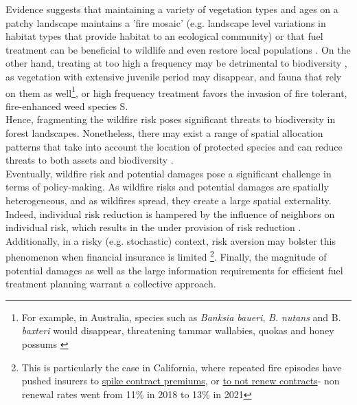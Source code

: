 Evidence suggests that maintaining a variety of vegetation types and ages on a patchy landscape maintains a 'fire mosaic' \citep{Sitters2015} (e.g. landscape level variations in habitat types that provide habitat to an ecological community) or that fuel treatment can be beneficial to wildlife \citep{saab_short-term_2022, loeb_bats_2021} and even restore local populations \citep{Templeton2011}. On the other hand, treating at too high a frequency may be detrimental to biodiversity \citep{bradshaw2018}, as vegetation with extensive juvenile period may disappear, and fauna that rely on them as well\footnote{For example, in Australia, species such as \textit{Banksia baueri}, \textit{B. nutans} and B. \textit{baxteri} would disappear, threatening tammar wallabies, quokas and honey possums \citep{bradshaw2018}}, or high frequency treatment favors the invasion of fire tolerant, fire-enhanced weed species \citep{vanWilgen_fire_2013}S. 
%
\\
Hence, fragmenting the wildfire risk poses significant threats to biodiversity in forest landscapes. Nonetheless, there may exist a range of spatial allocation patterns that take into account the location of protected species and can reduce threats to both assets and biodiversity \citep{ager_modeling_2007, king_relative_2008, rachmawati_fuel_2018}. 
\\
\hspace*{1.5em}Eventually, wildfire risk and potential damages pose a significant challenge in terms of policy-making. As wildfire risks and potential damages are spatially heterogeneous, and as wildfires spread, they create a large spatial externality. Indeed, individual risk reduction is hampered by the influence of neighbors on individual risk, which results in the under provision of risk reduction \citep{costello_private_2017}. Additionally, in a risky (e.g. stochastic) context, risk aversion may bolster this phenomenon when financial insurance is limited \citep{ehrlich_market_1972}\footnote{This is particularly the case in California, where repeated fire episodes have pushed insurers to \href{https://calmatters.org/economy/2024/05/california-insurance-mitigation/}{spike contract premiums}, or \href{https://www.nbclosangeles.com/news/california-wildfires/state-farm-california-los-angeles-homeowners-insurance-policy/3383583/}{to not renew contracts}- non renewal rates went from 11\% in 2018 to 13\% in 2021}. Finally, the magnitude of potential damages \citep{costello_private_2017} as well as the large information requirements for efficient fuel treatment planning warrant a collective approach.
